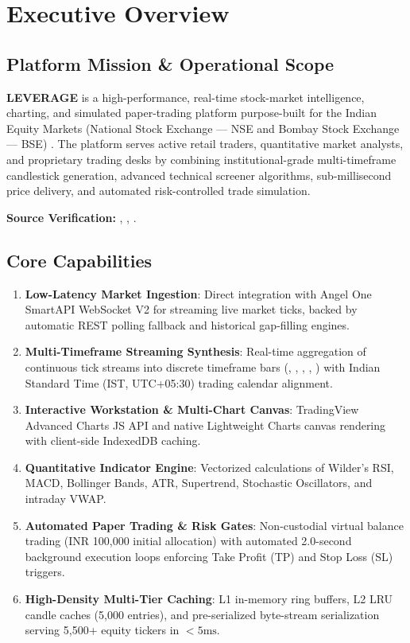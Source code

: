 \chapter{Executive Overview}
\label{ch:executive_overview}

\section{Platform Mission \& Operational Scope}
\textbf{LEVERAGE} is a high-performance, real-time stock-market intelligence, charting, and simulated paper-trading platform purpose-built for the Indian Equity Markets (National Stock Exchange --- NSE and Bombay Stock Exchange --- BSE) \cite{ref:main_py}. The platform serves active retail traders, quantitative market analysts, and proprietary trading desks by combining institutional-grade multi-timeframe candlestick generation, advanced technical screener algorithms, sub-millisecond price delivery, and automated risk-controlled trade simulation.

\begin{citationbox}
\textbf{Source Verification:} , , .
\end{citationbox}

\section{Core Capabilities}
\begin{enumerate}[leftmargin=6mm,itemsep=1.5mm]
    \item \textbf{Low-Latency Market Ingestion}: Direct integration with Angel One SmartAPI WebSocket V2 for streaming live market ticks, backed by automatic REST polling fallback and historical gap-filling engines.
    \item \textbf{Multi-Timeframe Streaming Synthesis}: Real-time aggregation of continuous tick streams into discrete timeframe bars (, , , , ) with Indian Standard Time (IST, UTC+05:30) trading calendar alignment.
    \item \textbf{Interactive Workstation \& Multi-Chart Canvas}: TradingView Advanced Charts JS API and native Lightweight Charts canvas rendering with client-side IndexedDB caching.
    \item \textbf{Quantitative Indicator Engine}: Vectorized calculations of Wilder's RSI, MACD, Bollinger Bands, ATR, Supertrend, Stochastic Oscillators, and intraday VWAP.
    \item \textbf{Automated Paper Trading \& Risk Gates}: Non-custodial virtual balance trading (INR 100,000 initial allocation) with automated 2.0-second background execution loops enforcing Take Profit (TP) and Stop Loss (SL) triggers.
    \item \textbf{High-Density Multi-Tier Caching}: L1 in-memory ring buffers, L2 LRU candle caches (5,000 entries), and pre-serialized byte-stream serialization serving 5,500+ equity tickers in $<5\text{ms}$.
\end{enumerate}

